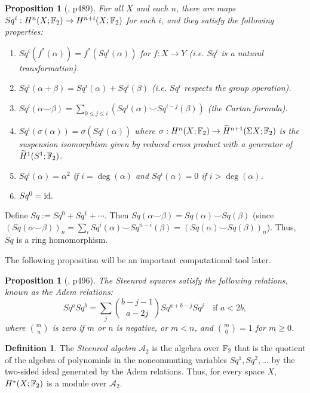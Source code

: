 \documentclass[11pt, titlepage]{article} %
\def\bb{\ensuremath\mathbb}
\def\id{\ensuremath\text{id}}
\numberwithin{equation}{subsection}
\theoremstyle{plain}
\newtheorem{proposition}[theorem]{Proposition}
\theoremstyle{definition}
\newtheorem{definition}[theorem]{Definition}
\begin{document}
\begin{proposition}[{\autocite{hatcher}, p489}]\label{2504201153}
For all \(X\) and each \(n\), there are maps \(Sq^i : H^n(X; \bb{F}_2)\to H^{n+i}(X; \bb{F}_2)\) for each \(i\), and they satisfy the following properties: \begin{enumerate}
\item \(Sq^i(f^*(\alpha))=f^*(Sq^i(\alpha))\) for \(f : X \to Y\) (i.e. \(Sq^i\) is a natural transformation).
\item \(Sq^i(\alpha + \beta)=Sq^i(\alpha)+Sq^i(\beta)\) (i.e. \(Sq^i\) respects the group operation).
\item \(Sq^i(\alpha \smile \beta)=\sum\limits_{0\leq j \leq i} (Sq^j(\alpha)\smile Sq^{i-j}(\beta))\) (the Cartan formula).
\item \(Sq^i(\sigma(\alpha))=\sigma(Sq^i(\alpha))\) where \(\sigma : H^n(X; \bb{F}_2)\to \widetilde{H}^{n+1}(\Sigma X; \bb{F}_2)\) is the suspension isomorphism given by reduced cross product with a generator of \(\widetilde{H}^1(S^1; \bb{F}_2)\).
\item \(Sq^i(\alpha)=\alpha^2\) if \(i=\deg(\alpha)\) and \(Sq^i(\alpha)=0\) if \(i> \deg(\alpha)\). 
\item \(Sq^0=\id.\)
\end{enumerate}
\end{proposition}

Define \(Sq:=Sq^0+Sq^1+\cdots\). Then \(Sq(\alpha\smile \beta)=Sq(\alpha)\smile Sq(\beta)\) (since \((Sq(\alpha\smile \beta))_n=\sum_iSq^i(\alpha)\smile Sq^{n-i}(\beta)=(Sq(\alpha)\smile Sq(\beta))_n\)). Thus, \(Sq\) is a ring homomorphism. 

The following proposition will be an important computational tool later. 

\begin{proposition}[{\autocite{hatcher}, p496}]\label{2504291153}
The Steenrod squares satisfy the following relations, known as the \textit{Adem relations}:
\[Sq^aSq^b=\sum_j {b-j-1\choose a-2j}Sq^{a+b-j}Sq^j \quad \text{if } a<2b,\]
where \({m \choose n}\) is zero if \(m\) or \(n\) is negative, or \(m<n\), and \({m \choose 0}=1\) for \(m \geq 0\).
\end{proposition}

\begin{definition}
The \textit{Steenrod algebra} \(\mathscr{A}_2\) is the algebra over \(\bb{F}_2\) that is the quotient of the algebra of polynomials in the noncommuting variables \(Sq^1, Sq^2, ...\) by the two-sided ideal generated by the Adem relations. Thus, for every space \(X\), \(H^*(X; \bb{F}_2)\) is a module over \(\mathscr A_2\).
\end{definition}
\end{document}

